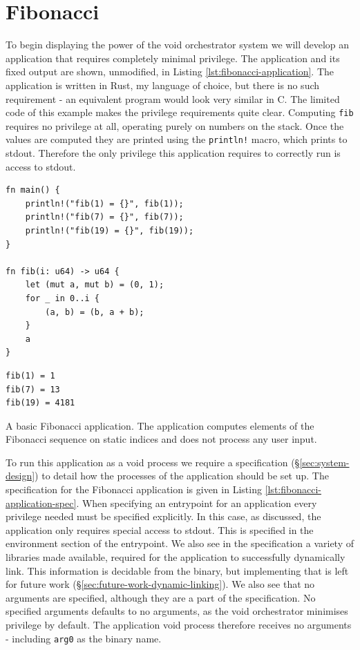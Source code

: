 \documentclass[12pt,a4paper,twoside]{report}
\begin{document}
\section{Fibonacci}
\label{sec:building-fib}

To begin displaying the power of the void orchestrator system we will develop an application that requires completely minimal privilege. The application and its fixed output are shown, unmodified, in Listing \ref{lst:fibonacci-application}. The application is written in Rust, my language of choice, but there is no such requirement - an equivalent program would look very similar in C. The limited code of this example makes the privilege requirements quite clear. Computing \texttt{fib} requires no privilege at all, operating purely on numbers on the stack. Once the values are computed they are printed using the \texttt{println!} macro, which prints to stdout. Therefore the only privilege this application requires to correctly run is access to stdout.

\begin{listing}
\begin{verbatim}
fn main() {
    println!("fib(1) = {}", fib(1));
    println!("fib(7) = {}", fib(7));
    println!("fib(19) = {}", fib(19));
}

fn fib(i: u64) -> u64 {
    let (mut a, mut b) = (0, 1);
    for _ in 0..i {
        (a, b) = (b, a + b);
    }
    a
}
\end{verbatim}
\begin{verbatim}
fib(1) = 1
fib(7) = 13
fib(19) = 4181
\end{verbatim}

\caption{A basic Fibonacci application. The application computes elements of the Fibonacci sequence on static indices and does not process any user input.}
\label{lst:fibonacci-application}
\end{listing}

To run this application as a void process we require a specification (§\ref{sec:system-design}) to detail how the processes of the application should be set up. The specification for the Fibonacci application is given in Listing \ref{lst:fibonacci-application-spec}. When specifying an entrypoint for an application every privilege needed must be specified explicitly. In this case, as discussed, the application only requires special access to stdout. This is specified in the environment section of the entrypoint. We also see in the specification a variety of libraries made available, required for the application to successfully dynamically link. This information is decidable from the binary, but implementing that is left for future work (§\ref{sec:future-work-dynamic-linking}). We also see that no arguments are specified, although they are a part of the specification. No specified arguments defaults to no arguments, as the void orchestrator minimises privilege by default. The application void process therefore receives no arguments - including \texttt{arg0} as the binary name.
\end{document}
